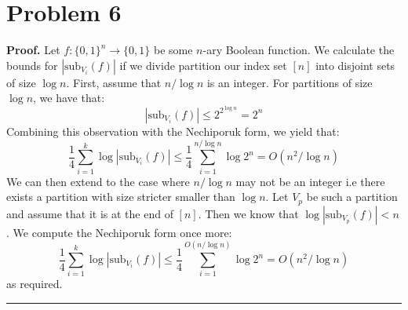 \documentclass[12pt]{article}%
\newenvironment{proof}[1][Proof]{\textbf{#1.} }{\ \rule{0.5em}{0.5em}}
\begin{document}
\section{Problem 6}
\begin{proof}
  Let $f: \{0,1\}^n \rightarrow \{0,1\}$ be some $n$-ary Boolean function. We calculate the bounds for $|\text{sub}_{V_i}(f)|$ if we divide partition our index set $[n]$ into disjoint sets of size $\log n$. First, assume that $n/\log n$ is an integer. For partitions of size $\log n$, we have that:
  $$ |\text{sub}_{V_i}(f)| \leq 2^{2^{\log n}} = 2^n $$
  Combining this observation with the Nechiporuk form, we yield that:
  $$ \frac{1}{4} \sum_{i=1}^k \log |\text{sub}_{V_i}(f)| \leq \frac{1}{4} \sum_{i=1}^{n/\log n} \log 2^n = O(n^2/\log n) $$
  We can then extend to the case where  $n / \log n$ may not be an integer i.e there exists a partition with size stricter smaller than $\log n$. Let $V_p$ be such a partition and assume that it is at the end of $[n]$. Then we know that $\log |\text{sub}_{V_p}(f)| < n$. We compute the Nechiporuk form once more:
  $$ \frac{1}{4} \sum_{i=1}^k \log |\text{sub}_{V_i}(f)| \leq \frac{1}{4}\sum_{i =1}^{O(n/\log n)} \log 2^n  = O(n^2/\log n)$$
  as required.
\end{proof}
\end{document}
